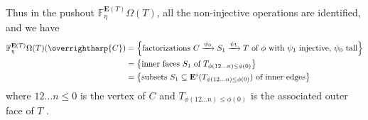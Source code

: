\documentclass[a4paper,10pt
,draft
]{article}%
\renewcommand{\1}{\eta}%
\newcommand{\vect}[1]{\text{\overrightharp{\ensuremath{#1}}}}
\begin{document}
Thus in the pushout $\mathbb F^{\mathbf E(T)}_\eta\Omega(T)$, all the non-injective operations are identified, and we have
\begin{align*}
  \mathbb F^{\mathbf E(T)}_\eta\Omega(T)(\vect C)
  & = \set{\mbox{factorizations $C \xrightarrow{\psi_0} S_1 \xrightarrow{\psi_1} T$ of $\phi$ with $\psi_1$ injective, $\psi_0$ tall}} \\
  & = \set{\mbox{inner faces $S_1$ of $T_{\phi(1 2 \dots n) \leq \phi(0)}$}} \\
  & = \set{\mbox{subsets $S_1 \subseteq \mathbf E^i(T_{\phi(1 2 \dots n) \leq \phi(0)})$ of inner edges}}    
\end{align*}
where $1 2 \dots n \leq 0$ is the vertex of $C$ and $T_{\phi(1 2 \dots n) \leq \phi(0)}$ is the associated outer face of $T$ .


\end{document}
